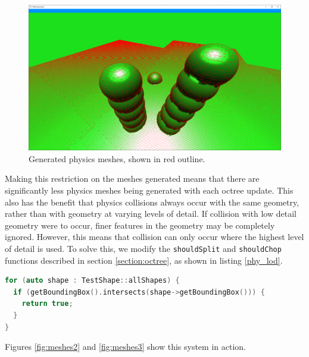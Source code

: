 \documentclass[11pt]{article}
\begin{document}
\begin{figure}[H]
  \includegraphics[width=\textwidth]{meshes1.png}
  \caption{Generated physics meshes, shown in red outline.}
  \label{fig:meshes1}
\end{figure}

Making this restriction on the meshes generated means that there are significantly less physics meshes being generated with each octree update. This also has the benefit that physics collisions always occur with the same geometry, rather than with geometry at varying levels of detail. If collision with low detail geometry were to occur, finer features in the geometry may be completely ignored. However, this means that collision can only occur where the highest level of detail is used. To solve this, we modify the \texttt{shouldSplit} and \texttt{shouldChop} functions described in section \ref{section:octree}, as shown in listing \ref{phy_lod}.

\begin{lstlisting}[language=C++,label={phy_lod},caption={Snippet from \texttt{shouldSplit} responsible for increasing the level of detail near a set of test physics objects. All chunks with bounding boxes that intersect the bounding box of a physics shape will be split until the highest detail level is reached. The octree refinement process described in section \ref{section:octree_refinement} ensures that this does not create any places where very different levels of detail are adjacent to each other.}]
for (auto shape : TestShape::allShapes) {
  if (getBoundingBox().intersects(shape->getBoundingBox())) {
    return true;
  }
}
\end{lstlisting}

Figures \ref{fig:meshes2} and \ref{fig:meshes3} show this system in action.
\end{document}
